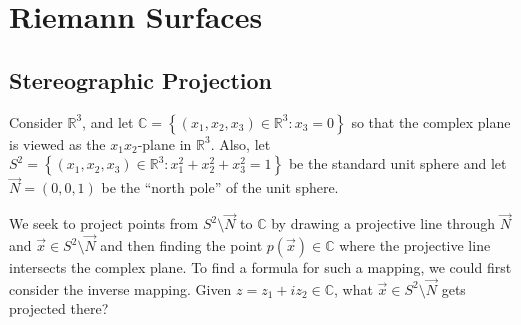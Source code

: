 





\newcommand{\vu}{\vec{u}}
\newcommand{\nhat}{\widehat{n}}
\newcommand{\pd}[2]{\df{\partial {#1}}{\partial {#2}}}
\newcommand{\lp}{\left(}
\newcommand{\rp}{\right)}
\newcommand{\df}[2]{\dfrac{{#1}}{{#2}}}
\newcommand{\beq}{\begin{equation}}
\newcommand{\eeq}{\end{equation}}

\newcommand{\ds}{\displaystyle}


\def\resetstyle#1{{\normalsize\rm\color[rgb]{0,0,0}\noindent#1}}



\chapter{Riemann Surfaces}

\section{Stereographic Projection}



Consider $\mathbb{R}^3$, and let $\mathbb{C}=\left\{(x_1,x_2,x_3)\in\mathbb{R}^3: x_3=0\right\}$ so that the complex plane is viewed as the $x_1x_2$-plane in $\mathbb{R}^3$. Also, let $S^2=\left\{(x_1,x_2,x_3)\in\mathbb{R}^3: x_1^2+x_2^2+x_3^2=1\right\}$ be the standard unit sphere and let $\vec{N}=\left(0,0,1\right)$ be the ``north pole'' of the unit sphere.

We seek to project points from $S^2\setminus \vec{N}$ to $\mathbb{C}$ by drawing a projective line through $\vec{N}$ and $\vec{x}\in S^2\setminus \vec{N}$ and then finding the point $p(\vec{x})\in\mathbb{C}$ where the projective line intersects the complex plane. To find a formula for such a mapping, we could first consider the inverse mapping. Given $z=z_1+iz_2\in\mathbb{C}$, what $\vec{x}\in S^2\setminus\vec{N}$ gets projected there?

